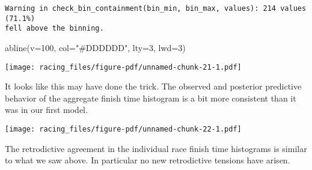 \documentclass[
  letterpaper,
  DIV=11,
  numbers=noendperiod]{scrartcl}
\newenvironment{Shaded}{\begin{snugshade}}{\end{snugshade}}
\newcommand{\AttributeTok}[1]{\textcolor[rgb]{0.40,0.45,0.13}{#1}}
\newcommand{\DecValTok}[1]{\textcolor[rgb]{0.68,0.00,0.00}{#1}}
\newcommand{\FunctionTok}[1]{\textcolor[rgb]{0.28,0.35,0.67}{#1}}
\newcommand{\NormalTok}[1]{\textcolor[rgb]{0.00,0.23,0.31}{#1}}
\newcommand{\SpecialCharTok}[1]{\textcolor[rgb]{0.37,0.37,0.37}{#1}}
\newcommand{\StringTok}[1]{\textcolor[rgb]{0.13,0.47,0.30}{#1}}
\begin{document}
\begin{verbatim}
Warning in check_bin_containment(bin_min, bin_max, values): 214 values (71.1%)
fell above the binning.
\end{verbatim}

\begin{Shaded}
\begin{Highlighting}[]
\FunctionTok{abline}\NormalTok{(}\AttributeTok{v=}\DecValTok{100}\NormalTok{, }\AttributeTok{col=}\StringTok{"\#DDDDDD"}\NormalTok{, }\AttributeTok{lty=}\DecValTok{3}\NormalTok{, }\AttributeTok{lwd=}\DecValTok{3}\NormalTok{)}
\end{Highlighting}
\end{Shaded}

\texttt{[image: racing\_files/figure-pdf/unnamed-chunk-21-1.pdf]}

It looks like this may have done the trick. The observed and posterior
predictive behavior of the aggregate finish time histogram is a bit more
consistent than it was in our first model.

\begin{Shaded}
\end{Shaded}

\texttt{[image: racing\_files/figure-pdf/unnamed-chunk-22-1.pdf]}

The retrodictive agreement in the individual race finish time histograms
is similar to what we saw above. In particular no new retrodictive
tensions have arisen.
\end{document}
